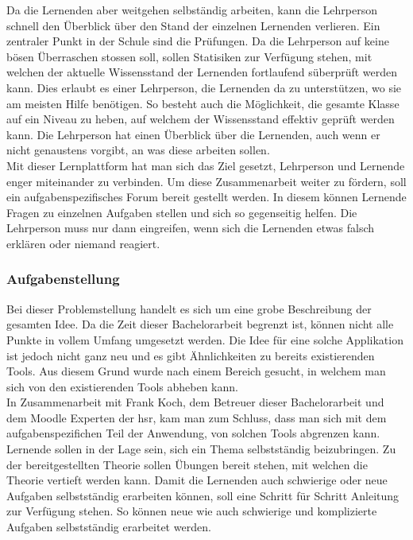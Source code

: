 Da die Lernenden aber weitgehen selbständig arbeiten, kann die Lehrperson schnell den Überblick über den Stand der einzelnen Lernenden verlieren. Ein zentraler Punkt in der Schule sind die Prüfungen. Da die Lehrperson auf keine bösen Überraschen stossen soll, sollen Statisiken zur Verfügung stehen, mit welchen der aktuelle Wissensstand der Lernenden fortlaufend süberprüft werden kann. Dies erlaubt es einer Lehrperson, die Lernenden da zu unterstützen, wo sie am meisten Hilfe benötigen. So besteht auch die Möglichkeit, die gesamte Klasse auf ein Niveau zu heben, auf welchem der Wissensstand effektiv geprüft werden kann. Die Lehrperson hat einen Überblick über die Lernenden, auch wenn er nicht genaustens vorgibt, an was diese arbeiten sollen. \\

Mit dieser Lernplattform hat man sich das Ziel gesetzt, Lehrperson und Lernende enger miteinander zu verbinden. Um diese Zusammenarbeit weiter zu fördern, soll ein aufgabenspezifisches Forum bereit gestellt werden. In diesem können Lernende Fragen zu einzelnen Aufgaben stellen und sich so gegenseitig helfen. Die Lehrperson muss nur dann eingreifen, wenn sich die Lernenden etwas falsch erklären oder niemand reagiert.

\subsubsection{Aufgabenstellung}
Bei dieser Problemstellung handelt es sich um eine grobe Beschreibung der gesamten Idee. Da die Zeit dieser Bachelorarbeit begrenzt ist, können nicht alle Punkte in vollem Umfang umgesetzt werden. Die Idee für eine solche Applikation ist jedoch nicht ganz neu und es gibt Ähnlichkeiten zu bereits existierenden Tools. Aus diesem Grund wurde nach einem Bereich gesucht, in welchem man sich von den existierenden Tools abheben kann. \\

In Zusammenarbeit mit Frank Koch, dem Betreuer dieser Bachelorarbeit und dem Moodle Experten der \gls{hsr}, kam man zum Schluss, dass man sich mit dem aufgabenspezifichen Teil der Anwendung, von solchen Tools abgrenzen kann. Lernende sollen in der Lage sein, sich ein Thema selbstständig beizubringen. Zu der bereitgestellten Theorie sollen Übungen bereit stehen, mit welchen die Theorie vertieft werden kann. Damit die Lernenden auch schwierige oder neue Aufgaben selbstständig erarbeiten können, soll eine Schritt für Schritt Anleitung zur Verfügung stehen. So können neue wie auch schwierige und komplizierte Aufgaben selbstständig erarbeitet werden.

